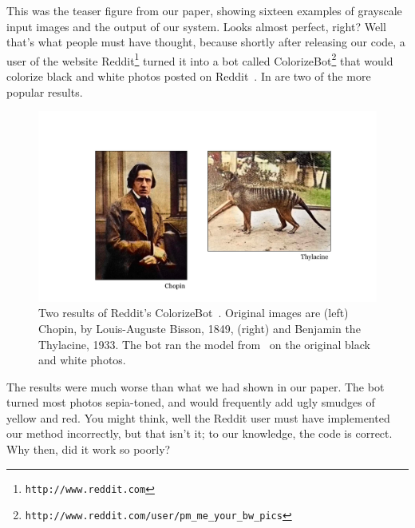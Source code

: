 This was the teaser figure from our paper, showing sixteen examples of grayscale input images and the output of our system. Looks almost perfect, right? Well that's what people must have thought, because shortly after releasing our code, a user of the website Reddit\footnote{\texttt{http://www.reddit.com}} turned it into a bot called ColorizeBot\footnote{\texttt{http://www.reddit.com/user/pm\_me\_your\_bw\_pics}} that would colorize black and white photos posted on Reddit~\cite{colorizebot_blog}. In \fig{\ref{fig:bias_and_shift:colorizebot_examples}} are two of the more popular results.
\begin{figure}[h!]
    \centerline{
    \includegraphics[width=0.7\linewidth]{./figures/bias_and_shift/colorizebot_examples.pdf}
    }
    \caption{Two results of Reddit's ColorizeBot~\cite{colorizebot_blog}. Original images are (left) Chopin, by Louis-Auguste Bisson, 1849, (right) and Benjamin the Thylacine, 1933. The bot ran the model from~\cite{zhang2016colorful} on the original black and white photos.}
    \label{fig:bias_and_shift:colorizebot_examples}
\end{figure}

The results were much worse than what we had shown in our paper. The bot turned most photos sepia-toned, and would frequently add ugly smudges of yellow and red. You might think, well the Reddit user must have implemented our method incorrectly, but that isn't it; to our knowledge, the code is correct. Why then, did it work so poorly?


